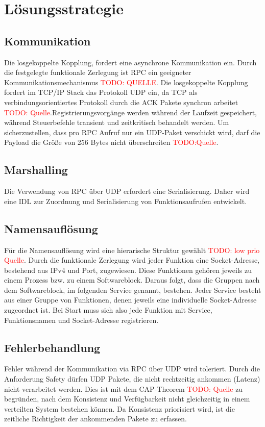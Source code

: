 \chapter{Lösungsstrategie}


\section*{Kommunikation}
Die losgekoppelte Kopplung, fordert eine asynchrone Kommunikation ein. 
Durch die festgelegte funktionale Zerlegung ist RPC ein geeigneter Kommunikationsmechanismus \textcolor{red}{TODO: QUELLE}. Die losgekoppelte Kopplung fordert im TCP/IP Stack das Protokoll UDP ein, da TCP als verbindungsorientiertes Protokoll durch die ACK Pakete synchron arbeitet \textcolor{red}{TODO: Quelle}.Registrierungsvorgänge werden während der Laufzeit gespeichert, während Steuerbefehle transient und zeitkritisch behandelt werden. Um sicherzustellen, dass pro RPC Aufruf nur ein UDP-Paket verschickt wird, darf die Payload die Größe von 256 Bytes nicht überschreiten \textcolor{red}{TODO:Quelle}.
	
\section*{Marshalling}
Die Verwendung von RPC über UDP erfordert eine Serialisierung.
Daher wird eine IDL zur Zuordnung und Serialisierung von Funktionsaufrufen entwickelt.
	
\section*{Namensauflösung}
Für die Namensauflösung wird eine hierarische Struktur gewählt \textcolor{red}{TODO: low prio Quelle}. Durch die funktionale Zerlegung wird jeder Funktion eine Socket-Adresse, bestehend aus IPv4 und Port, zugewiesen. Diese Funktionen gehören jeweils zu einem Prozess bzw. zu einem Softwareblock. Daraus folgt, dass die Gruppen nach dem Softwareblock, im folgenden Service genannt, bestehen. Jeder Service besteht aus einer Gruppe von Funktionen, denen jeweils eine individuelle Socket-Adresse zugeordnet ist. Bei Start muss sich also jede Funktion mit Service, Funktionsnamen und Socket-Adresse registrieren.

\section*{Fehlerbehandlung}
Fehler während der Kommunikation via RPC über UDP wird toleriert. Durch die Anforderung Safety dürfen UDP Pakete, die nicht rechtzeitig ankommen (Latenz) nicht verarbeitet werden. Dies ist mit dem CAP-Theorem \textcolor{red}{TODO: Quelle} zu begründen, nach dem Konsistenz und Verfügbarkeit nicht gleichzeitig in einem verteilten System bestehen können. Da Konsistenz priorisiert wird, ist die zeitliche Richtigkeit der ankommenden Pakete zu erfassen. 

